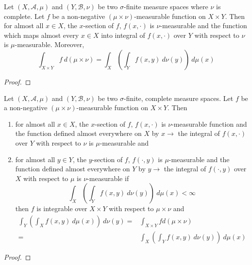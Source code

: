 \begin{theorem}[Tonelli]
	Let $(X,\mathcal{A},\mu)$ and $(Y,\mathcal{B},\nu)$ be two $\sigma$-finite measure spaces where $\nu$ is complete.
	Let $f$ be a non-negative $(\mu \times \nu)$-measurable function on $X \times Y$.
	Then for almost all $x \in X$, the $x$-section of $f$, $f(x,\cdot)$ is $\nu$-measurable and the function which maps almost every $x \in X$ into integral of $f(x,\cdot)$ over $Y$ with respect to $\nu$ is $\mu$-measurable.
	Moreover,
	\begin{equation}
		\int_{X \times Y} f \ d(\mu \times \nu) = \int_X \left( \int_Y f(x,y) \ d\nu(y) \right) \ d\mu(x)
	\end{equation}
\end{theorem}
\begin{proof}
\end{proof}

\begin{corollary}
	Let $(X,\mathcal{A},\mu)$ and $(Y,\mathcal{B},\nu)$ be two $\sigma$-finite, complete measure spaces.
	Let $f$ be a non-negative $(\mu \times \nu)$-measurable function on $X \times Y$.
	Then
	\begin{enumerate}
		\item for almost all $x \in X$, the $x$-section of $f$, $f(x,\cdot)$ is $\nu$-measurable function and the function defined almost everywhere on $X$ by $x \to $ the integral of $f(x,\cdot)$ over $Y$ with respect to $\nu$ is $\mu$-measurable and
		\item for almost all $y \in Y$, the $y$-section of $f$, $f(\cdot,y)$ is $\mu$-measurable and the function defined almost everywhere on $Y$ by $y \to $ the integral of $f(\cdot,y)$ over $X$ with respect to $\mu$ is $\nu$-measurable if
		\begin{equation}
			\int_X \left( \int_Y f(x,y) \ d\nu(y) \right) \ d\mu(x) < \infty
		\end{equation}
		then $f$ is integrable over $X \times Y$ with respect to $\mu \times \nu$ and
		\begin{align}
			\int_Y \left( \int_X f(x,y) \ d\mu(x) \right) \ d\nu(y) = & \int_{X \times Y} f d(\mu \times \nu) \\
			= & \int_X \left( \int_Y f(x,y) \ d\nu(y) \right) \ d\mu(x) \nonumber
		\end{align}
	\end{enumerate}
\end{corollary}
\begin{proof}
\end{proof}

